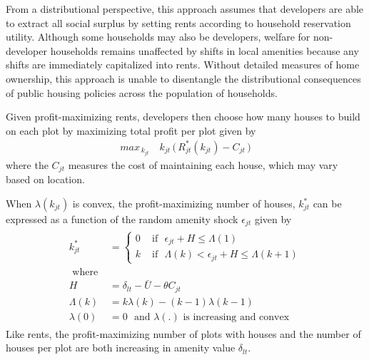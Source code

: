 \documentclass[12pt]{article}
\begin{document}
From a distributional perspective, this approach assumes that developers are able to extract all social surplus by setting rents according to household reservation utility.  Although some households may also be developers, welfare for non-developer households remains unaffected by shifts in local amenities because any shifts are immediately capitalized into rents.  Without detailed measures of home ownership, this approach is unable to disentangle the distributional consequences of public housing policies across the population of households.

Given profit-maximizing rents, developers then choose how many houses to build on each plot by maximizing total profit per plot given by
\begin{align*}
max_{\,k_{jt}} \,\,\,\,\,\,  k_{jt} \, \Big( \, R_{jt}^{*}(k_{jt}) - C_{jt} \, \Big )
\end{align*}
\noindent where the $C_{jt}$ measures the cost of maintaining each house, which may vary based on location.


When $\lambda(k_{jt})$ is convex, the profit-maximizing number of houses, $k^{*}_{jt}$ can be expressed as a function of the random amenity shock $\epsilon_{jt}$ given by
\begin{align}
\label{eq:housingdemand}
\begin{split}
k_{jt}^{*} &=
\begin{cases}
0 &\text{ if }\,\, \epsilon_{jt} + H \leq \Lambda(1)  \\
k &\text{ if }\,\,  \Lambda(k) < \epsilon_{jt} + H \leq \Lambda(k+1)
\end{cases} \\
\text{ where }& \\
H & = \delta_{lt} - \bar{U} - \theta C_{jt}   \\
\Lambda(k) & =  k\lambda(k) - (k-1)\lambda(k-1) \\
\lambda(0) & = 0 \,\, \text{ and } \lambda(.) \text{ is increasing and convex }
\end{split}
\end{align}
Like rents, the profit-maximizing number of plots with houses and the number of houses per plot are both increasing in amenity value $\delta_{lt}$.  
\end{document}
